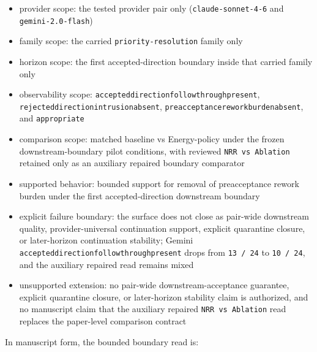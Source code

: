 \documentclass[11pt]{article}
\renewcommand{\_}{\textunderscore\hspace{0pt}}
\begin{document}
\begin{itemize}
\item provider scope:
  the tested provider pair only (\texttt{claude-sonnet-4-6} and
  \texttt{gemini-2.0-flash})
\item family scope:
  the carried \texttt{priority-resolution} family only
\item horizon scope:
  the first accepted-direction boundary inside that carried family only
\item observability scope:
  \texttt{accepted\_direction\_followthrough\_present},
  \texttt{rejected\_direction\_intrusion\_absent},
  \texttt{preacceptance\_rework\_burden\_absent}, and \texttt{appropriate}
\item comparison scope:
  matched baseline vs Energy-policy under the frozen downstream-boundary pilot
  conditions, with reviewed \texttt{NRR vs Ablation} retained only as an
  auxiliary repaired boundary comparator
\item supported behavior:
  bounded support for removal of preacceptance rework burden under the first
  accepted-direction downstream boundary
\item explicit failure boundary:
  the surface does not close as pair-wide downstream quality, provider-universal
  continuation support, explicit quarantine closure, or later-horizon
  continuation stability; Gemini
  \texttt{accepted\_direction\_followthrough\_present} drops from
  \texttt{13 / 24} to \texttt{10 / 24}, and the auxiliary repaired read
  remains mixed
\item unsupported extension:
  no pair-wide downstream-acceptance guarantee, explicit quarantine closure, or
  later-horizon stability claim is authorized, and no manuscript claim that the
  auxiliary repaired \texttt{NRR vs Ablation} read replaces the paper-level
  comparison contract
\end{itemize}

In manuscript form, the bounded boundary read is:
\end{document}
